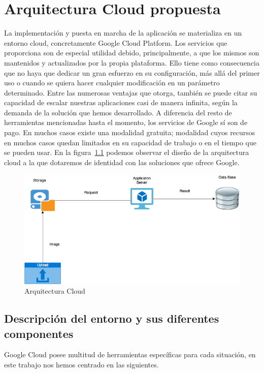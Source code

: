 \cleardoublepage
\mbox{}

\lstset{
language=Python,
basicstyle=\small\sffamily,
numbers=left,
numberstyle=\tiny,
frame=tb,
columns=fullflexible,
showstringspaces=false
}
\chapter{Arquitectura Cloud propuesta}
\label{ch:chapter4}
La implementación y puesta en marcha de la aplicación se materializa en un entorno cloud, concretamente Google Cloud Platform.
Los servicios que proporciona son de especial utilidad debido, principalmente, a que los mismos son mantenidos y actualizados por la propia plataforma.
Ello tiene como consecuencia que no haya que dedicar un gran esfuerzo en su configuración, más allá del primer uso o cuando se quiera hacer cualquier modificación en un parámetro determinado.
Entre las numerosas ventajas que otorga, también se puede citar su capacidad de escalar nuestras aplicaciones casi de manera infinita, según la demanda de la solución que hemos desarrollado.
A diferencia del resto de herramientas mencionadas hasta el momento, los servicios de Google sí son de pago.
En muchos casos existe una modalidad gratuita;
modalidad cuyos recursos en muchos casos quedan limitados en su capacidad de trabajo o en el tiempo que se pueden usar.
En la figura~\ref{fig:Arquitectura Cloud} podemos observar el diseño de la arquitectura cloud a la que dotaremos de identidad con las soluciones que ofrece Google.

\begin{figure}
    \centering
    \includegraphics[width=1.0\textwidth]{images/chapter4/cloud_architecture.png}
    \caption{Arquitectura Cloud}
    \label{fig:Arquitectura Cloud}
\end{figure}

\section{Descripción del entorno y sus diferentes componentes}\label{sec:descripción-del-entorno-y-sus-diferentes-componentes}
Google Cloud posee multitud de herramientas específicas para cada situación, en este trabajo nos hemos centrado en las siguientes.

